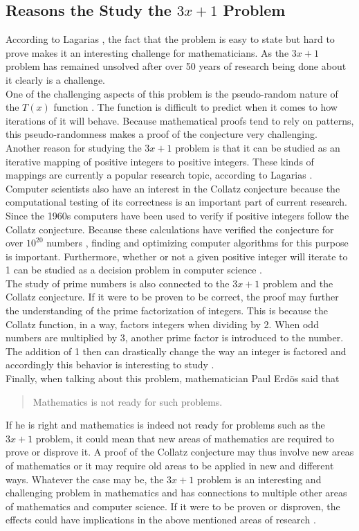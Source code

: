 \documentclass[12pt,a4paper,reqno]{amsart}
\begin{document}
\subsection{Reasons the Study the $3x+1$ Problem}

According to Lagarias \cite{src:lagarias}, the fact that the problem is easy to 
state but hard to prove makes it an interesting challenge for mathematicians.
As the $3x+1$ problem has remained unsolved after over 50 years of research 
being done about it clearly is a challenge. \\
One of the challenging aspects of this problem is the pseudo-random nature of 
the $T(x)$ function \cite{src:lagarias}. The function is difficult to predict 
when it comes to how iterations of it will behave. Because mathematical proofs 
tend to rely on patterns, this pseudo-randomness makes a proof of the 
conjecture very challenging. Another reason for studying the $3x+1$ problem is 
that it can be studied as an iterative mapping of positive integers to positive 
integers. These kinds of mappings are currently a popular research topic, 
according to Lagarias \cite{src:lagarias}. \\
Computer scientists also have an interest in the Collatz conjecture because 
the computational testing of its correctness is an important part of current 
research. Since the 1960s computers have been used to verify if positive 
integers follow the Collatz conjecture. Because these calculations have 
verified the conjecture for over $10^{20}$ numbers \cite{src:tao}, finding and 
optimizing computer algorithms for this purpose is important. Furthermore, 
whether or not a given positive integer will iterate to 1 can be studied as a 
decision problem in computer science \cite{src:lagarias}. \\
The study of prime numbers is also connected to the $3x+1$ problem and the
Collatz conjecture. If it were to be proven to be correct, the proof may 
further the understanding of the prime factorization of integers. This is 
because the Collatz function, in a way, factors integers when dividing by 2. 
When odd numbers are multiplied by 3, another prime factor is introduced to the 
number. The addition of 1 then can drastically change the way an integer is 
factored and accordingly this behavior is interesting to study 
\cite{src:lagarias}. \\
Finally, when talking about this problem, mathematician Paul Erdös said that
\begin{quote}
Mathematics is not ready for such problems.
\end{quote}
If he is right and mathematics is indeed not ready for problems such as the
$3x+1$ problem, it could mean that new areas of mathematics are required to
prove or disprove it. A proof of the Collatz conjecture may thus involve new 
areas of mathematics or it may require old areas to be applied in new and
different ways. Whatever the case may be, the $3x+1$ problem is an interesting
and challenging problem in mathematics and has connections to multiple other
areas of mathematics and computer science. If it were to be proven or
disproven, the effects could have implications in the above mentioned areas of
research \cite{src:lagarias}.
\end{document}
